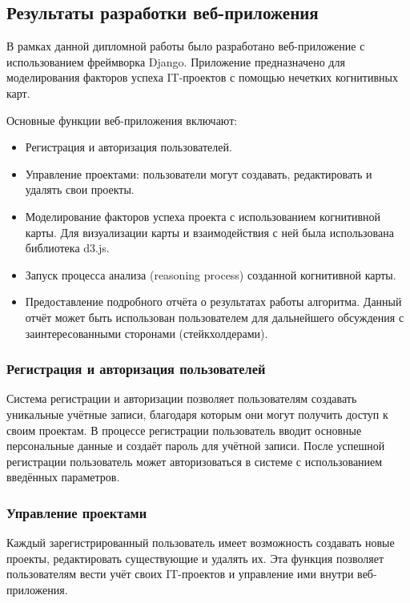 \documentclass{article}
\begin{document}
    \subsection{Результаты разработки веб-приложения}

    В рамках данной дипломной работы было разработано веб-приложение с использованием фреймворка Django. Приложение предназначено для моделирования факторов успеха IT-проектов с помощью нечетких когнитивных карт.

    Основные функции веб-приложения включают:
    \begin{itemize}
        \item Регистрация и авторизация пользователей.
        \item Управление проектами: пользователи могут создавать, редактировать и удалять свои проекты.
        \item Моделирование факторов успеха проекта с использованием когнитивной карты. Для визуализации карты и взаимодействия с ней была использована библиотека d3.js.
        \item Запуск процесса анализа (reasoning process) созданной когнитивной карты.
        \item Предоставление подробного отчёта о результатах работы алгоритма. Данный отчёт может быть использован пользователем для дальнейшего обсуждения с заинтересованными сторонами (стейкхолдерами).
    \end{itemize}

    \subsubsection{Регистрация и авторизация пользователей}

    Система регистрации и авторизации позволяет пользователям создавать уникальные учётные записи, благодаря которым они могут получить доступ к своим проектам. В процессе регистрации пользователь вводит основные персональные данные и создаёт пароль для учётной записи. После успешной регистрации пользователь может авторизоваться в системе с использованием введённых параметров.

    \subsubsection{Управление проектами}

    Каждый зарегистрированный пользователь имеет возможность создавать новые проекты, редактировать существующие и удалять их. Эта функция позволяет пользователям вести учёт своих IT-проектов и управление ими внутри веб-приложения.
\end{document}
